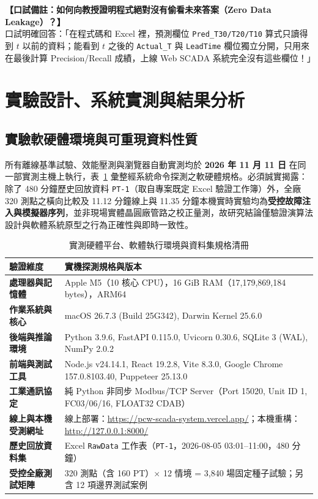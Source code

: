 \documentclass[fontset=none, a4paper, 12pt]{ctexart}
\begin{document}
\begin{doublespace}
\noindent\textbf{【口試備註：如何向教授證明程式絕對沒有偷看未來答案（Zero Data Leakage）？】}\\
口試明確回答：「在程式碼和 Excel 裡，預測欄位 \texttt{Pred\_T30/T20/T10} 算式只讀得到 $t$ 以前的資料；能看到 $t$ 之後的 \texttt{Actual\_T} 與 \texttt{LeadTime} 欄位獨立分開，只用來在最後計算 Precision/Recall 成績，上線 Web SCADA 系統完全沒有這些欄位！」

\clearpage
\section{實驗設計、系統實測與結果分析}

\subsection{實驗軟硬體環境與可重現資料性質}
所有離線基準試驗、效能壓測與瀏覽器自動實測均於 \textbf{2026 年 11 月 11 日} 在同一部實測主機上執行，表~\ref{tab:env_real} 彙整經系統命令探測之軟硬體規格。必須誠實揭露：除了 480 分鐘歷史回放資料 \texttt{PT-1}（取自專案既定 Excel 驗證工作簿）外，全廠 320 測點之橫向比較及 11.12 分鐘線上與 11.35 分鐘本機實時實驗均為\textbf{受控故障注入與模擬器序列}，並非現場實體晶圓廠管路之校正量測，故研究結論僅驗證演算法設計與軟體系統原型之行為正確性與即時一致性。

\begin{table}[H]
\centering
\caption{實測硬體平台、軟體執行環境與資料集規格清冊}
\label{tab:env_real}
\footnotesize
\renewcommand{\arraystretch}{1.15}
\setlength{\tabcolsep}{5pt}
\begin{tabularx}{0.96\textwidth}{>{\bfseries}lX}
\toprule
驗證維度 & 實機探測規格與版本 \\
\midrule
處理器與記憶體 & Apple M5（10 核心 CPU），16 GiB RAM（17,179,869,184 bytes），ARM64 \\
作業系統與核心 & macOS 26.7.3 (Build 25G342), Darwin Kernel 25.6.0 \\
後端與推論環境 & Python 3.9.6, FastAPI 0.115.0, Uvicorn 0.30.6, SQLite 3 (WAL), NumPy 2.0.2 \\
前端與測試工具 & Node.js v24.14.1, React 19.2.8, Vite 8.3.0, Google Chrome 157.0.8103.40, Puppeteer 25.13.0 \\
工業通訊協定 & 純 Python 非同步 Modbus/TCP Server（Port 15020, Unit ID 1, FC03/06/16, FLOAT32 CDAB） \\
線上與本機受測網址 & 線上部署：\url{https://pcw-scada-system.vercel.app/}；本機重構：\url{http://127.0.0.1:8000/} \\
歷史回放資料集 & Excel \texttt{RawData} 工作表（\texttt{PT-1}，2026-08-05 03:01--11:00，480 分鐘） \\
受控全廠測試矩陣 & 320 測點（含 160 PT）$\times$ 12 情境 = 3,840 場固定種子試驗；另含 12 項邊界測試案例 \\
\bottomrule
\end{tabularx}
\end{table}


\end{doublespace}
\end{document}
